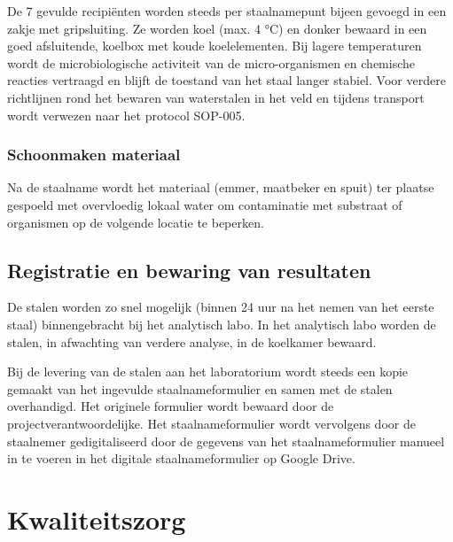 \documentclass[
]{scrreprt}
\begin{document}
De 7 gevulde recipiënten worden steeds per staalnamepunt bijeen gevoegd in een zakje met gripsluiting. Ze worden koel (max. 4 °C) en donker bewaard in een goed afsluitende, koelbox met koude koelelementen. Bij lagere temperaturen wordt de microbiologische activiteit van de micro-organismen en chemische reacties vertraagd en blijft de toestand van het staal langer stabiel. Voor verdere richtlijnen rond het bewaren van waterstalen in het veld en tijdens transport wordt verwezen naar het protocol SOP-005.

\subsection{\texorpdfstring{\textbf{Schoonmaken materiaal}}{Schoonmaken materiaal}}\label{schoonmaken-materiaal}

Na de staalname wordt het materiaal (emmer, maatbeker en spuit) ter plaatse gespoeld met overvloedig lokaal water om contaminatie met substraat of organismen op de volgende locatie te beperken.

\section{Registratie en bewaring van resultaten}\label{registratie-en-bewaring-van-resultaten}

De stalen worden zo snel mogelijk (binnen 24 uur na het nemen van het eerste staal) binnengebracht bij het analytisch labo. In het analytisch labo worden de stalen, in afwachting van verdere analyse, in de koelkamer bewaard.

Bij de levering van de stalen aan het laboratorium wordt steeds een kopie gemaakt van het ingevulde staalnameformulier en samen met de stalen overhandigd. Het originele formulier wordt bewaard door de projectverantwoordelijke. Het staalnameformulier wordt vervolgens door de staalnemer gedigitaliseerd door de gegevens van het staalnameformulier manueel in te voeren in het digitale staalnameformulier op Google Drive.

\chapter{Kwaliteitszorg}\label{kwaliteitszorg}
\end{document}
